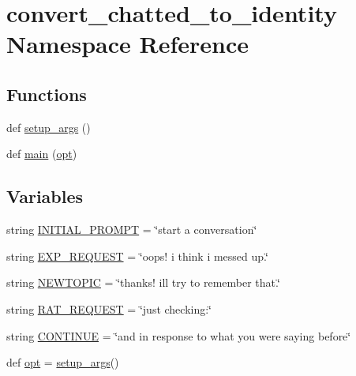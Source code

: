 \hypertarget{namespaceconvert__chatted__to__identity}{}\section{convert\+\_\+chatted\+\_\+to\+\_\+identity Namespace Reference}
\label{namespaceconvert__chatted__to__identity}
\subsection*{Functions}
\begin{DoxyCompactItemize}
\item 
def \hyperlink{namespaceconvert__chatted__to__identity_afcf3d0107d9de04c08b48929cf9d1a98}{setup\+\_\+args} ()
\item 
def \hyperlink{namespaceconvert__chatted__to__identity_ab4644532a7d6d29c252859898f3f8feb}{main} (\hyperlink{namespaceconvert__chatted__to__identity_adb18bef210c0d71a26157290dae3de50}{opt})
\end{DoxyCompactItemize}
\subsection*{Variables}
\begin{DoxyCompactItemize}
\item 
string \hyperlink{namespaceconvert__chatted__to__identity_ab8daf92e5d381194d14658d53040ccc9}{I\+N\+I\+T\+I\+A\+L\+\_\+\+P\+R\+O\+M\+PT} = \char`\"{}start a conversation\char`\"{}
\item 
string \hyperlink{namespaceconvert__chatted__to__identity_a3820634e905e1eb0c4581a3615e65161}{E\+X\+P\+\_\+\+R\+E\+Q\+U\+E\+ST} = \char`\"{}oops! i think i messed up.\char`\"{}
\item 
string \hyperlink{namespaceconvert__chatted__to__identity_a1cbbb450279e5646add165c7e3e8188a}{N\+E\+W\+T\+O\+P\+IC} = \char`\"{}thanks! i\textquotesingle{}ll try to remember that.\char`\"{}
\item 
string \hyperlink{namespaceconvert__chatted__to__identity_aa0293030e3a25ceb0a4102fe4dd40c98}{R\+A\+T\+\_\+\+R\+E\+Q\+U\+E\+ST} = \char`\"{}just checking\+:\char`\"{}
\item 
string \hyperlink{namespaceconvert__chatted__to__identity_a1c276d1d014f24512ac3ddbd33f3cdf3}{C\+O\+N\+T\+I\+N\+UE} = \char`\"{}and in response to what you were saying before\char`\"{}
\item 
def \hyperlink{namespaceconvert__chatted__to__identity_adb18bef210c0d71a26157290dae3de50}{opt} = \hyperlink{namespaceconvert__chatted__to__identity_afcf3d0107d9de04c08b48929cf9d1a98}{setup\+\_\+args}()
\end{DoxyCompactItemize}


